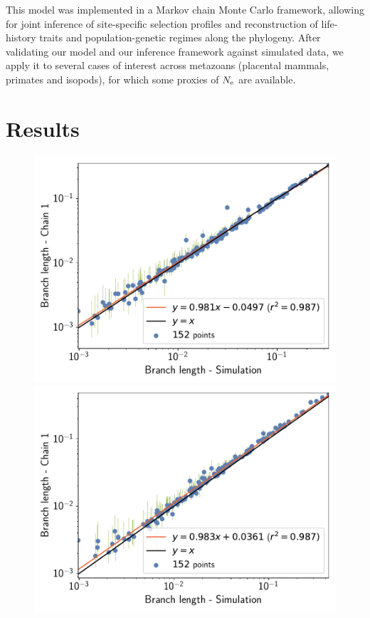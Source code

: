 \documentclass{MBE}
\begin{document}
	This model was implemented in a {Markov chain Monte Carlo} framework, allowing for joint inference of site-specific selection profiles and reconstruction of life-history traits and population-genetic regimes along the phylogeny.
	After validating our model and our inference framework against simulated data, we apply it to several cases of interest across metazoans (placental mammals, primates and isopods), for which some proxies of $N_{\text{e}}$ are available.


	\section{Results}
	\label{sec:Results}

	\begin{figure}[t]
		\centering
		\begin{minipage}{0.32\linewidth}
			\includegraphics[width=\linewidth, page=1]{simulations/BranchWise_SimuDiv_SiteMutSelBranchNe_BranchCorrelation_Log10BranchLength}
		\end{minipage}
		\hfill
		\begin{minipage}{0.32\linewidth}
			\includegraphics[width=\linewidth, page=1]{simulations/SimuPoly_SiteMutSelBranchNe_BranchCorrelation_Log10BranchLength}

\end{minipage}
\end{figure}
\end{document}
